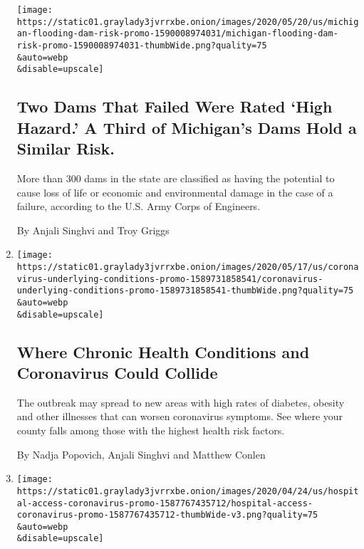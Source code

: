 \begin{enumerate}
  \texttt{[image: https://static01.graylady3jvrrxbe.onion/images/2020/05/20/us/michigan-flooding-dam-risk-promo-1590008974031/michigan-flooding-dam-risk-promo-1590008974031-thumbWide.png?quality=75\\\&auto=webp\\\&disable=upscale]}

  \hypertarget{two-dams-that-failed-were-rated-high-hazard-a-third-of-michigans-dams-hold-a-similar-risk}{%
  \subsection{Two Dams That Failed Were Rated `High Hazard.' A Third of
  Michigan's Dams Hold a Similar
  Risk.}\label{two-dams-that-failed-were-rated-high-hazard-a-third-of-michigans-dams-hold-a-similar-risk}}

  More than 300 dams in the state are classified as having the potential
  to cause loss of life or economic and environmental damage in the case
  of a failure, according to the U.S. Army Corps of Engineers.

  By Anjali Singhvi and Troy Griggs
\item
  \href{/interactive/2020/05/18/us/coronavirus-underlying-conditions.html}{}

  \texttt{[image: https://static01.graylady3jvrrxbe.onion/images/2020/05/17/us/coronavirus-underlying-conditions-promo-1589731858541/coronavirus-underlying-conditions-promo-1589731858541-thumbWide.png?quality=75\\\&auto=webp\\\&disable=upscale]}

  \hypertarget{where-chronic-health-conditions-and-coronavirus-could-collide}{%
  \subsection{Where Chronic Health Conditions and Coronavirus Could
  Collide}\label{where-chronic-health-conditions-and-coronavirus-could-collide}}

  The outbreak may spread to new areas with high rates of diabetes,
  obesity and other illnesses that can worsen coronavirus symptoms. See
  where your county falls among those with the highest health risk
  factors.

  By Nadja Popovich, Anjali Singhvi and Matthew Conlen
\item
  \href{/interactive/2020/04/26/us/us-hospital-access-coronavirus.html}{}

  \texttt{[image: https://static01.graylady3jvrrxbe.onion/images/2020/04/24/us/hospital-access-coronavirus-promo-1587767435712/hospital-access-coronavirus-promo-1587767435712-thumbWide-v3.png?quality=75\\\&auto=webp\\\&disable=upscale]}


\end{enumerate}
